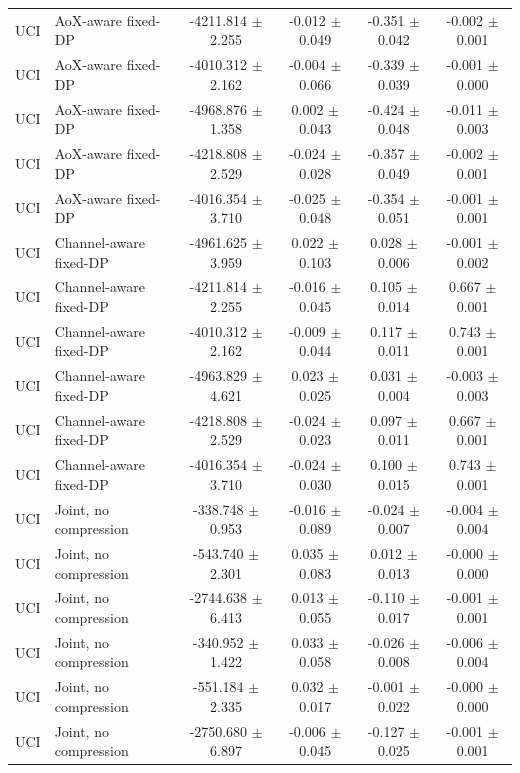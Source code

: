 \begin{table}[t]
\begin{tabular}{llcccc}
UCI & AoX-aware fixed-DP & -4211.814 $\pm$ 2.255 & -0.012 $\pm$ 0.049 & -0.351 $\pm$ 0.042 & -0.002 $\pm$ 0.001 \\
UCI & AoX-aware fixed-DP & -4010.312 $\pm$ 2.162 & -0.004 $\pm$ 0.066 & -0.339 $\pm$ 0.039 & -0.001 $\pm$ 0.000 \\
UCI & AoX-aware fixed-DP & -4968.876 $\pm$ 1.358 & 0.002 $\pm$ 0.043 & -0.424 $\pm$ 0.048 & -0.011 $\pm$ 0.003 \\
UCI & AoX-aware fixed-DP & -4218.808 $\pm$ 2.529 & -0.024 $\pm$ 0.028 & -0.357 $\pm$ 0.049 & -0.002 $\pm$ 0.001 \\
UCI & AoX-aware fixed-DP & -4016.354 $\pm$ 3.710 & -0.025 $\pm$ 0.048 & -0.354 $\pm$ 0.051 & -0.001 $\pm$ 0.001 \\
UCI & Channel-aware fixed-DP & -4961.625 $\pm$ 3.959 & 0.022 $\pm$ 0.103 & 0.028 $\pm$ 0.006 & -0.001 $\pm$ 0.002 \\
UCI & Channel-aware fixed-DP & -4211.814 $\pm$ 2.255 & -0.016 $\pm$ 0.045 & 0.105 $\pm$ 0.014 & 0.667 $\pm$ 0.001 \\
UCI & Channel-aware fixed-DP & -4010.312 $\pm$ 2.162 & -0.009 $\pm$ 0.044 & 0.117 $\pm$ 0.011 & 0.743 $\pm$ 0.001 \\
UCI & Channel-aware fixed-DP & -4963.829 $\pm$ 4.621 & 0.023 $\pm$ 0.025 & 0.031 $\pm$ 0.004 & -0.003 $\pm$ 0.003 \\
UCI & Channel-aware fixed-DP & -4218.808 $\pm$ 2.529 & -0.024 $\pm$ 0.023 & 0.097 $\pm$ 0.011 & 0.667 $\pm$ 0.001 \\
UCI & Channel-aware fixed-DP & -4016.354 $\pm$ 3.710 & -0.024 $\pm$ 0.030 & 0.100 $\pm$ 0.015 & 0.743 $\pm$ 0.001 \\
UCI & Joint, no compression & -338.748 $\pm$ 0.953 & -0.016 $\pm$ 0.089 & -0.024 $\pm$ 0.007 & -0.004 $\pm$ 0.004 \\
UCI & Joint, no compression & -543.740 $\pm$ 2.301 & 0.035 $\pm$ 0.083 & 0.012 $\pm$ 0.013 & -0.000 $\pm$ 0.000 \\
UCI & Joint, no compression & -2744.638 $\pm$ 6.413 & 0.013 $\pm$ 0.055 & -0.110 $\pm$ 0.017 & -0.001 $\pm$ 0.001 \\
UCI & Joint, no compression & -340.952 $\pm$ 1.422 & 0.033 $\pm$ 0.058 & -0.026 $\pm$ 0.008 & -0.006 $\pm$ 0.004 \\
UCI & Joint, no compression & -551.184 $\pm$ 2.335 & 0.032 $\pm$ 0.017 & -0.001 $\pm$ 0.022 & -0.000 $\pm$ 0.000 \\
UCI & Joint, no compression & -2750.680 $\pm$ 6.897 & -0.006 $\pm$ 0.045 & -0.127 $\pm$ 0.025 & -0.001 $\pm$ 0.001 \\

\end{tabular}
\end{table}
